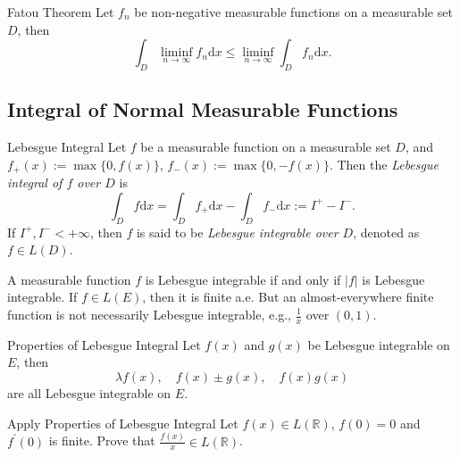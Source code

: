 \begin{theorem}{Fatou Theorem}{}
  Let $f_n$ be non-negative measurable functions on a measurable set $D$,
  then
  \begin{equation}
    \int_D \liminf \limits_{n \rightarrow \infty} f_n\mathrm{d} x
    \leq \liminf \limits_{n \rightarrow \infty} \int_D f_n\mathrm{d} x.
  \end{equation}
\end{theorem}


\subsection{Integral of Normal Measurable Functions}

\begin{definition}{Lebesgue Integral}{}
  Let $f$ be a measurable function on a measurable set $D$,
  and $f_+(x) := \max\{0, f(x)\}$, $f_-(x) := \max\{0, -f(x)\}$.
  Then the \emph{Lebesgue integral of $f$ over $D$} is
  \begin{equation}
    \int_D f \mathrm{d} x 
    = \int_D f_+ \mathrm{d} x - \int_D f_-\mathrm{d} x
    := I^+ - I^-.
  \end{equation}
  If $I^+, I^- < +\infty$, then $f$ is said to be \emph{Lebesgue integrable over
    $D$}, denoted as $f \in L(D)$.
\end{definition}

\begin{note}
  A measurable function $f$ is Lebesgue integrable if and only if $|f|$ is Lebesgue integrable.
  If $f \in L(E)$, then it is finite a.e.
  But an almost-everywhere finite function is not necessarily Lebesgue integrable, e.g., $\frac{1}{x}$ over $(0, 1)$.
\end{note}

\begin{proposition}{Properties of Lebesgue Integral}{}
  Let $f(x)$ and $g(x)$ be Lebesgue integrable on $E$, then
  \begin{equation}
    \lambda f(x), \quad f(x) \pm g(x), \quad f(x)g(x)
  \end{equation}
  are all Lebesgue integrable on $E$.
\end{proposition}

\begin{example}{Apply Properties of Lebesgue Integral}{}
  Let $f(x) \in L(\mathbb{R})$, $f(0) = 0$ and $f^{\prime}(0)$ is finite.
  Prove that $\frac{f(x)}{x} \in L(\mathbb{R})$.
\end{example}

